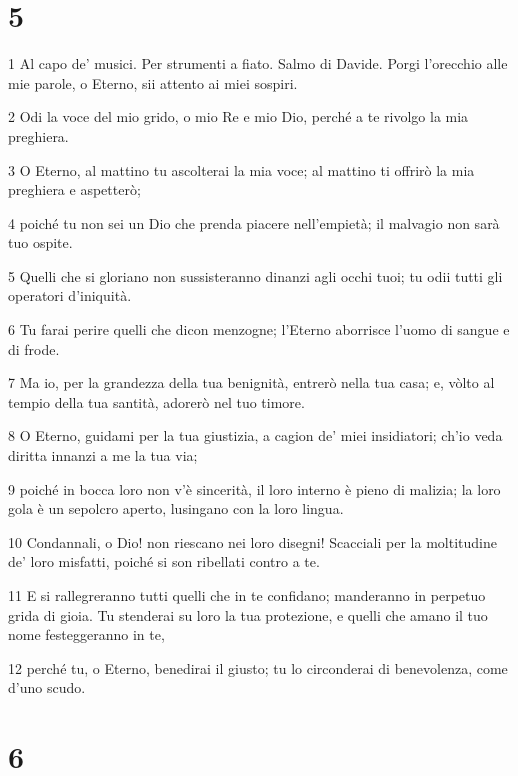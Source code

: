 \chapter{5}

\par 1 Al capo de' musici. Per strumenti a fiato. Salmo di Davide. Porgi l'orecchio alle mie parole, o Eterno, sii attento ai miei sospiri.
\par 2 Odi la voce del mio grido, o mio Re e mio Dio, perché a te rivolgo la mia preghiera.
\par 3 O Eterno, al mattino tu ascolterai la mia voce; al mattino ti offrirò la mia preghiera e aspetterò;
\par 4 poiché tu non sei un Dio che prenda piacere nell'empietà; il malvagio non sarà tuo ospite.
\par 5 Quelli che si gloriano non sussisteranno dinanzi agli occhi tuoi; tu odii tutti gli operatori d'iniquità.
\par 6 Tu farai perire quelli che dicon menzogne; l'Eterno aborrisce l'uomo di sangue e di frode.
\par 7 Ma io, per la grandezza della tua benignità, entrerò nella tua casa; e, vòlto al tempio della tua santità, adorerò nel tuo timore.
\par 8 O Eterno, guidami per la tua giustizia, a cagion de' miei insidiatori; ch'io veda diritta innanzi a me la tua via;
\par 9 poiché in bocca loro non v'è sincerità, il loro interno è pieno di malizia; la loro gola è un sepolcro aperto, lusingano con la loro lingua.
\par 10 Condannali, o Dio! non riescano nei loro disegni! Scacciali per la moltitudine de' loro misfatti, poiché si son ribellati contro a te.
\par 11 E si rallegreranno tutti quelli che in te confidano; manderanno in perpetuo grida di gioia. Tu stenderai su loro la tua protezione, e quelli che amano il tuo nome festeggeranno in te,
\par 12 perché tu, o Eterno, benedirai il giusto; tu lo circonderai di benevolenza, come d'uno scudo.

\chapter{6}


